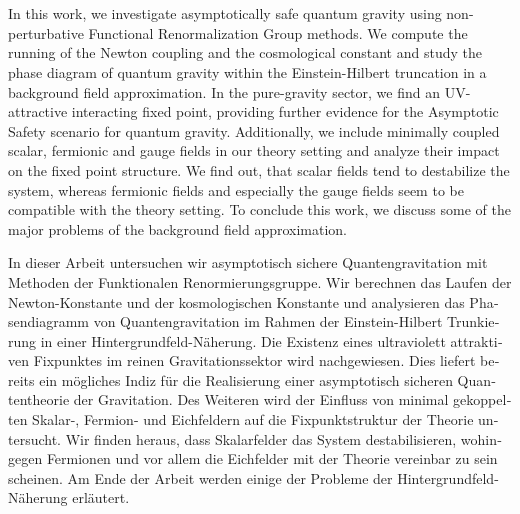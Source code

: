 {\hypersetup{allcolors=black}
\thispagestyle{plain}

\makeatletter

\begin{center}
\textbf{\large\@title} \\
\vspace{.1cm}
\@author \\
\end{center}

\makeatother

In this work, we investigate asymptotically  safe quantum gravity using non-perturbative Functional Renormalization Group methods. We compute the running of the Newton coupling and the cosmological constant and study the phase diagram of quantum gravity within the Einstein-Hilbert truncation in a background field approximation. In the pure-gravity sector, we find an UV-attractive interacting fixed point, providing further evidence for the Asymptotic Safety scenario for quantum gravity. Additionally, we include minimally coupled scalar, fermionic and gauge fields in our theory setting and analyze their impact on the fixed point structure. We find out, that scalar fields tend to destabilize the system, whereas fermionic fields and especially the gauge fields seem to be compatible with    the theory setting. To conclude this work, we discuss some of the major problems of the background field approximation.


\vfill

\begin{otherlanguage}{german}
In dieser Arbeit untersuchen wir asymptotisch sichere Quantengravitation mit Methoden der Funktionalen Renormierungsgruppe. Wir berechnen das Laufen der Newton-Konstante und der kosmologischen Konstante und analysieren das Phasendiagramm von Quantengravitation im Rahmen der Einstein-Hilbert Trunkierung in einer Hintergrundfeld-N\"aherung. Die Existenz eines ultraviolett attraktiven Fixpunktes im reinen Gravitationssektor wird nachgewiesen. Dies liefert bereits ein m\"ogliches Indiz f\"ur die Realisierung einer asymptotisch sicheren Quantentheorie der Gravitation. Des Weiteren wird der Einfluss von minimal gekoppelten Skalar-, Fermion- und Eichfeldern auf die Fixpunktstruktur der Theorie untersucht. Wir finden heraus, dass Skalarfelder das System destabilisieren, wohingegen Fermionen und vor allem die Eichfelder mit der Theorie vereinbar zu sein scheinen. Am Ende der Arbeit werden einige der Probleme der Hintergrundfeld-N\"aherung erl\"autert.
\end{otherlanguage}
\vfill
\cleardoublepage}
